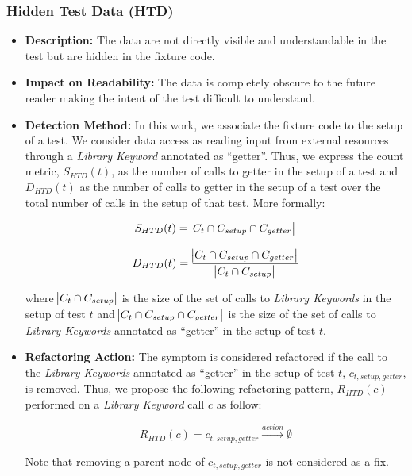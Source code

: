 \subsubsection{Hidden Test Data (HTD)}

\begin{itemize}
    \item \textbf{Description:} The data are not directly visible and understandable in the test but are hidden in the fixture code.
    
    \item \textbf{Impact on Readability:} The data is completely obscure to the future reader making the intent of the test difficult to understand.
    
    \item \textbf{Detection Method:} In this work, we associate the fixture code to the setup of a test. We consider data access as reading input from external resources through a \emph{Library Keyword} annotated as ``getter''. Thus, we express the count metric, $S_{HTD}(t)$, as the number of calls to getter in the setup of a test and $D_{HTD}(t)$ as the number of calls to getter in the setup of a test over the total number of calls in the setup of that test. More formally:

    \begin{equation*}
        S_{HTD}(t) = \abs{C_{t} \cap C_{setup} \cap C_{getter}}
    \end{equation*}
    
    \begin{equation*}
        D_{HTD}(t) = \frac{\abs{C_{t} \cap C_{setup} \cap C_{getter}}}{\abs{C_{t} \cap C_{setup}}}
    \end{equation*}
    
    where $\abs{C_{t} \cap C_{setup}}$ is the size of the set of calls to \emph{Library Keywords} in the setup of test $t$ and $\abs{C_{t} \cap C_{setup} \cap C_{getter}}$ is the size of the set of calls to \emph{Library Keywords} annotated as ``getter'' in the setup of test $t$.
    
    \item \textbf{Refactoring Action:} The symptom is considered refactored if the call to the \emph{Library Keywords} annotated as ``getter'' in the setup of test $t$, $c_{t, setup, getter}$, is removed. Thus, we propose the following refactoring pattern, $R_{HTD}(c)$ performed on a \emph{Library Keyword} call $c$ as follow:

    \begin{equation*}
        R_{HTD}(c) = c_{t, setup, getter} \xrightarrow{action}  \emptyset
    \end{equation*}
    
    Note that removing a parent node of $c_{t, setup, getter}$ is not considered as a fix.
\end{itemize}

